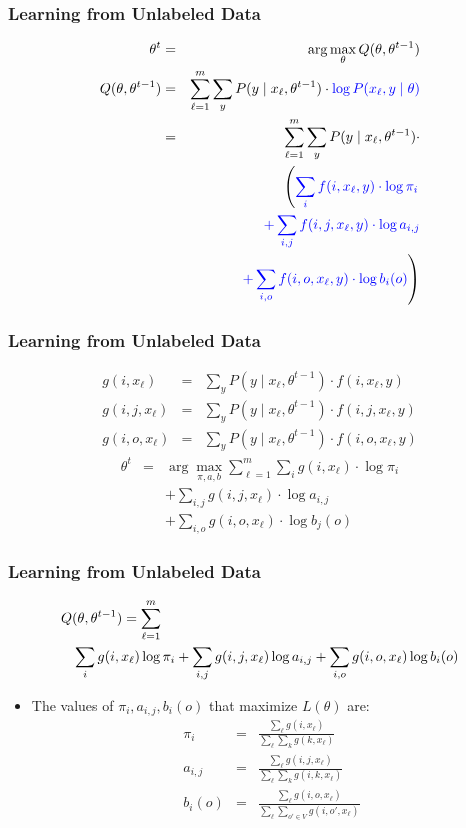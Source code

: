 \begin{frame}
\frametitle{Learning from Unlabeled Data}
\begin{eqnarray*}
\theta^t &=& \arg\max_\theta Q(\theta, \theta^{t-1})\\
Q(\theta, \theta^{t-1}) &=& \sum_{\ell=1}^m \sum_y P(y \mid x_\ell, \theta^{t-1}) \cdot {\color{blue} \log P(x_\ell, y \mid \theta)} \\
&=& \sum_{\ell=1}^m \sum_y P(y \mid x_\ell, \theta^{t-1}) \cdot \\
&& \left( {\color{blue}  \sum_i f(i, x_\ell, y) \cdot \log \pi_i } \right. \\
&& {\color{blue} + \sum_{i,j} f(i,j,x_\ell,y) \cdot \log a_{i,j} } \\
&& \left. {\color{blue} + \sum_{i,o} f(i,o,x_\ell,y) \cdot \log b_i(o) } \right)
\end{eqnarray*}
\end{frame}

\begin{frame}
\frametitle{Learning from Unlabeled Data}
\begin{eqnarray*}
g(i,x_\ell) &=& \sum_y P(y \mid x_\ell, \theta^{t-1}) \cdot f(i, x_\ell, y) \\
g(i,j,x_\ell) &=& \sum_y P(y \mid x_\ell, \theta^{t-1}) \cdot f(i, j, x_\ell, y) \\
g(i,o,x_\ell) &=& \sum_y P(y \mid x_\ell, \theta^{t-1}) \cdot f(i, o, x_\ell, y)
\end{eqnarray*}
\begin{eqnarray*}
\theta^t & = & \arg\max_{\pi,a,b} \sum_{\ell=1}^m \sum_i g(i,x_\ell) \cdot \log \pi_i \\
&& + \sum_{i,j} g(i,j,x_\ell) \cdot \log a_{i,j} \\
&& + \sum_{i,o} g(i,o,x_\ell) \cdot \log b_j(o)
\end{eqnarray*}
\end{frame}

\begin{frame}
\frametitle{Learning from Unlabeled Data}
{\small\begin{eqnarray*}
\lefteqn{Q(\theta,\theta^{t-1}) = \sum_{\ell=1}^m  } \\
&& \sum_i g(i,x_\ell) \log \pi_i + \sum_{i,j} g(i,j,x_\ell) \log a_{i,j} + \sum_{i,o} g(i,o,x_\ell) \log b_i(o) \end{eqnarray*}}
\begin{itemize}[<+->]
\item The values of $\pi_i, a_{i,j}, b_i(o)$ that maximize $L(\theta)$ are:
\begin{eqnarray*}
\pi_i & = & \frac{\sum_\ell g(i,x_\ell)}{\sum_\ell \sum_k g(k,x_\ell)} \\
a_{i,j} & = & \frac{\sum_\ell g(i,j,x_\ell)}{\sum_\ell \sum_k g(i,k,x_\ell)} \\
b_i(o) & = & \frac{\sum_\ell g(i,o,x_\ell)}{\sum_\ell \sum_{o' \in V} g(i,o',x_\ell)} 
\end{eqnarray*}
\end{itemize}
\end{frame}

